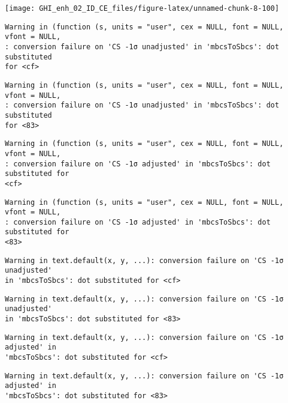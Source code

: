 \documentclass[
  10pt,
  a4paper,oneside]{article}
\begin{document}
\begin{center}\texttt{[image: GHI\_enh\_02\_ID\_CE\_files/figure-latex/unnamed-chunk-8-100]} \end{center}

\begin{verbatim}
Warning in (function (s, units = "user", cex = NULL, font = NULL, vfont = NULL,
: conversion failure on 'CS -1σ unadjusted' in 'mbcsToSbcs': dot substituted
for <cf>
\end{verbatim}

\begin{verbatim}
Warning in (function (s, units = "user", cex = NULL, font = NULL, vfont = NULL,
: conversion failure on 'CS -1σ unadjusted' in 'mbcsToSbcs': dot substituted
for <83>
\end{verbatim}

\begin{verbatim}
Warning in (function (s, units = "user", cex = NULL, font = NULL, vfont = NULL,
: conversion failure on 'CS -1σ adjusted' in 'mbcsToSbcs': dot substituted for
<cf>
\end{verbatim}

\begin{verbatim}
Warning in (function (s, units = "user", cex = NULL, font = NULL, vfont = NULL,
: conversion failure on 'CS -1σ adjusted' in 'mbcsToSbcs': dot substituted for
<83>
\end{verbatim}

\begin{verbatim}
Warning in text.default(x, y, ...): conversion failure on 'CS -1σ unadjusted'
in 'mbcsToSbcs': dot substituted for <cf>
\end{verbatim}

\begin{verbatim}
Warning in text.default(x, y, ...): conversion failure on 'CS -1σ unadjusted'
in 'mbcsToSbcs': dot substituted for <83>
\end{verbatim}

\begin{verbatim}
Warning in text.default(x, y, ...): conversion failure on 'CS -1σ adjusted' in
'mbcsToSbcs': dot substituted for <cf>
\end{verbatim}

\begin{verbatim}
Warning in text.default(x, y, ...): conversion failure on 'CS -1σ adjusted' in
'mbcsToSbcs': dot substituted for <83>
\end{verbatim}
\end{document}
